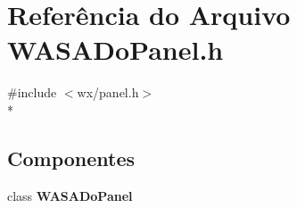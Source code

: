 \section{Referência do Arquivo W\+A\+S\+A\+Do\+Panel.\+h}
\label{_w_a_s_a_do_panel_8h}
{\ttfamily \#include $<$wx/panel.\+h$>$}\\*
\subsection*{Componentes}
\begin{DoxyCompactItemize}
\item 
class {\bf W\+A\+S\+A\+Do\+Panel}
\end{DoxyCompactItemize}
